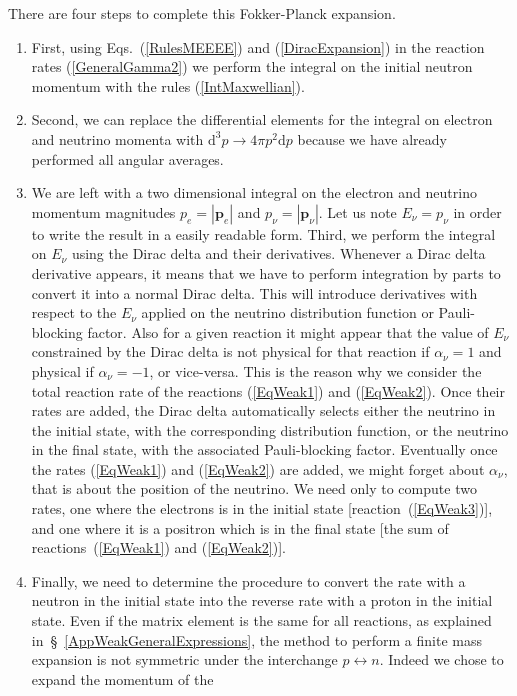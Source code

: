 \documentclass[onecolumn,float,floatfix,preprintnumbers,aps,rmp,nofootinbib,amsmath,amssymb,amsfonts,superscriptaddress,tightenlines]{revtex4}
\newcommand{\gr}[1]{\mathbf{#1}}
\newcommand{\dd}{\mathrm{d}}
\newcommand{\coeffa}{\alpha}
\begin{document}
There are four steps to complete this Fokker-Planck
expansion. 
\begin{enumerate}
\item First, using Eqs.~(\ref{RulesMEEEE}) and (\ref{DiracExpansion}) in
the reaction rates (\ref{GeneralGamma2}) we perform the integral on
the initial neutron momentum with the rules
(\ref{IntMaxwellian}). 
\item Second, we can replace the differential elements
for the integral on electron and neutrino momenta with $\dd^3 p \to
4\pi p^2 \dd p$ because we have already performed all angular
averages. 
\item We are left with a two dimensional integral
on the electron and neutrino momentum magnitudes $p_e=|\gr{p}_e|$ and
$p_\nu=|\gr{p}_\nu|$. Let us note $E_\nu=p_\nu$ in order to write the
result in a easily readable form. Third, we perform the integral on  $E_\nu$ using the Dirac delta and their derivatives. Whenever a
Dirac delta derivative appears, it means that we have to perform
integration by parts to convert it into a normal Dirac delta. This
will introduce derivatives with respect to the $E_\nu$ applied on the
neutrino distribution function or Pauli-blocking factor. Also for a
given reaction it might appear that the value of $E_\nu$ constrained
by the Dirac delta is not physical for that reaction if
$\coeffa_\nu=1$ and physical if $\coeffa_\nu=-1$, or vice-versa. This is the
reason why we consider the total reaction rate of the reactions (\ref{EqWeak1}) and (\ref{EqWeak2}). Once their rates are added, the
Dirac delta automatically selects either the neutrino in the initial
state, with the corresponding distribution function, or the neutrino
in the final state, with the associated Pauli-blocking
factor. Eventually once the rates (\ref{EqWeak1}) and (\ref{EqWeak2})
are added, we might forget about $\coeffa_\nu$, that is about the
position of the neutrino. We need only to compute two rates, one where
the electrons is in the initial state [reaction~(\ref{EqWeak3})], and
one where it is a positron which is in the final state [the sum of reactions~(\ref{EqWeak1}) and (\ref{EqWeak2})].
\item Finally, we need to determine the procedure to convert the rate with a neutron in the initial state into the reverse rate with a proton in the initial state. Even if the matrix
  element is the same for all reactions, as explained
  in~\S~\ref{AppWeakGeneralExpressions}, the method to perform a
  finite mass expansion is not symmetric under the interchange $p
  \leftrightarrow n$. Indeed we chose to expand the momentum of the

\end{enumerate}
\end{document}
